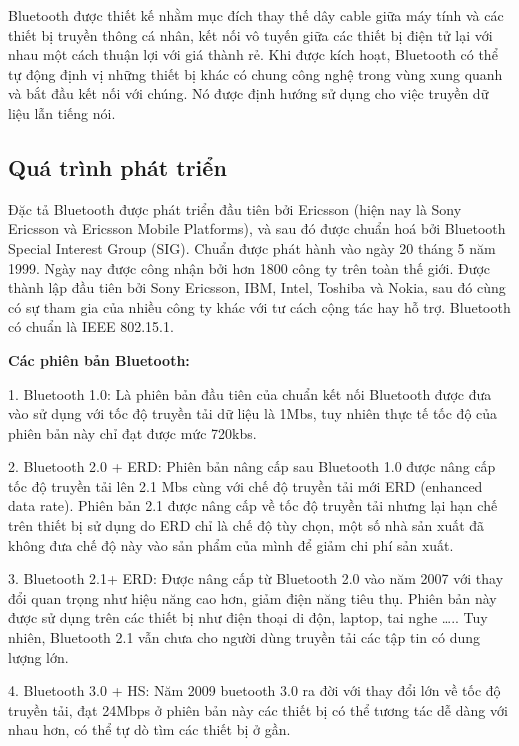 Bluetooth được thiết kế nhằm mục đích thay thế dây cable giữa máy tính và các thiết bị truyền thông cá nhân, kết nối vô tuyến giữa các thiết bị điện tử lại với nhau một cách thuận lợi với giá thành rẻ. Khi được kích hoạt, Bluetooth có thể tự động định vị những thiết bị khác có chung công nghệ trong vùng xung quanh và bắt đầu kết nối với chúng. Nó được định hướng sử dụng cho việc truyền dữ liệu lẫn tiếng nói.

\subsection{Quá trình phát triển}
Đặc tả Bluetooth được phát triển đầu tiên bởi Ericsson (hiện nay là Sony Ericsson và Ericsson Mobile Platforms), và sau đó được chuẩn hoá bởi Bluetooth Special Interest Group (SIG). Chuẩn được phát hành vào ngày 20 tháng 5 năm 1999. Ngày nay được công nhận bởi hơn 1800 công ty trên toàn thế giới. Được thành lập đầu tiên bởi Sony Ericsson, IBM, Intel, Toshiba và Nokia, sau đó cùng có sự tham gia của nhiều công ty khác với tư cách cộng tác hay hỗ trợ. Bluetooth có chuẩn là IEEE 802.15.1.

\textbf{Các phiên bản Bluetooth:}

1.    Bluetooth 1.0: Là phiên bản đầu tiên của chuẩn kết nối Bluetooth được đưa vào sử dụng với tốc độ truyền tải dữ liệu là 1Mbs, tuy nhiên thực tế tốc độ của phiên bản này chỉ đạt được mức 720kbs.

2.    Bluetooth 2.0 + ERD: Phiên bản nâng cấp sau Bluetooth 1.0 được nâng cấp tốc độ truyền tải lên 2.1 Mbs cùng với chế độ truyền tải mới ERD (enhanced data rate). Phiên bản 2.1 được nâng cấp về tốc độ truyền tải nhưng lại hạn chế trên thiết bị sử dụng do ERD chỉ là chế độ tùy chọn, một số nhà sản xuất đã không đưa chế độ này vào sản phẩm của mình để giảm chi phí sản xuất.

3.    Bluetooth 2.1+ ERD: Được nâng cấp từ Bluetooth 2.0 vào năm 2007 với thay đổi quan trọng như hiệu năng cao hơn, giảm điện năng tiêu thụ. Phiên bản này được sử dụng trên các thiết bị như điện thoại di độn, laptop, tai nghe ….. Tuy nhiên, Bluetooth 2.1 vẫn chưa cho người dùng truyền tải các tập tin có dung lượng lớn.

4.    Bluetooth 3.0 + HS: Năm 2009 buetooth 3.0 ra đời với thay đổi lớn về tốc độ truyền tải, đạt 24Mbps ở phiên bản này các thiết bị có thể tương tác dễ dàng với nhau hơn, có thể tự dò tìm các thiết bị ở gần.


